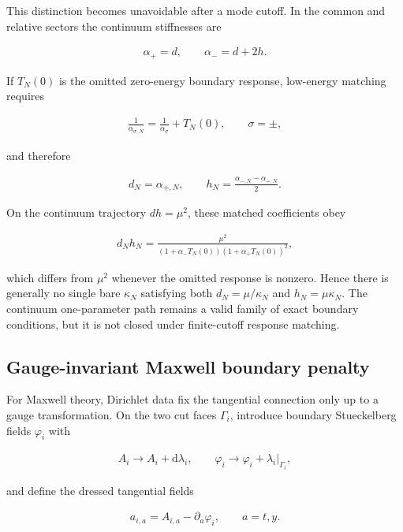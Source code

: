 This distinction becomes unavoidable after a mode cutoff. In the common and relative sectors the continuum stiffnesses are

\begin{align}
\alpha_+=d,
\qquad
\alpha_-=d+2h.
\end{align}

If $T_N(0)$ is the omitted zero-energy boundary response, low-energy matching requires

\begin{align}
\frac1{\alpha_{\sigma,N}}
=\frac1{\alpha_\sigma}+T_N(0),
\qquad \sigma=\pm,
\end{align}

and therefore

\begin{align}
d_N=\alpha_{+,N},
\qquad
h_N=\frac{\alpha_{-,N}-\alpha_{+,N}}2.
\end{align}

On the continuum trajectory $d h=\mu^2$, these matched coefficients obey

\begin{align}
d_Nh_N
=\frac{\mu^2}{
\left(1+\alpha_-T_N(0)\right)
\left(1+\alpha_+T_N(0)\right)^2},
\end{align}

which differs from $\mu^2$ whenever the omitted response is nonzero. Hence there is generally no single bare $\kappa_N$ satisfying both $d_N=\mu/\kappa_N$ and $h_N=\mu\kappa_N$. The continuum one-parameter path remains a valid family of exact boundary conditions, but it is not closed under finite-cutoff response matching.

\subsection{Gauge-invariant Maxwell boundary penalty}\label{subsec:dirichlet-maxwell}

For Maxwell theory, Dirichlet data fix the tangential connection only up to a gauge transformation. On the two cut faces $\Gamma_i$, introduce boundary Stueckelberg fields $\varphi_i$ with

\begin{align}
A_i\longrightarrow A_i+\mathrm d\lambda_i,
\qquad
\varphi_i\longrightarrow\varphi_i+\lambda_i\big|_{\Gamma_i},
\end{align}

and define the dressed tangential fields

\begin{align}
a_{i,a}=A_{i,a}-\partial_a\varphi_i,
\qquad
a=t,y.
\end{align}

